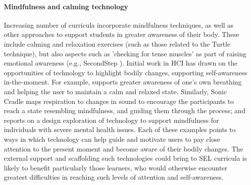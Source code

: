 \documentclass[prodmode,acmtochi]{acmsmall}
\begin{document}

\paragraph{Mindfulness and calming technology}
Increasing number of curricula incorporate mindfulness techniques, as well as other approaches to support students in greater awareness of their body. These include calming and relaxation exercises (such as those related to the Turtle technique), but also aspects such as 'checking for tense muscles' as part of raising emotional awareness (e.g., SecondStep \cite{Webster-Stratton2004}). Initial work in HCI has drawn on the opportunities of technology to highlight bodily changes, supporting self-awareness in-the-moment. For example,  supports greater awareness of one's own breathing and helping the user to maintain a calm and relaxed state. 
Similarly, Sonic Cradle maps respiration to changes in sound to encourage the participants to reach a state resembling mindfulness, and guiding them through the process; and  reports on a design exploration of technology to support mindfulness for individuals with severe mental health issues. Each of these examples points to ways in which technology can help guide and motivate users to pay close attention to the present moment and become aware of their bodily changes. The external support and scaffolding such technologies could bring to SEL curricula is likely to benefit particularly those learners, who would otherwise encounter greatest difficulties in reaching such levels of attention and self-awareness. 


\end{document}

